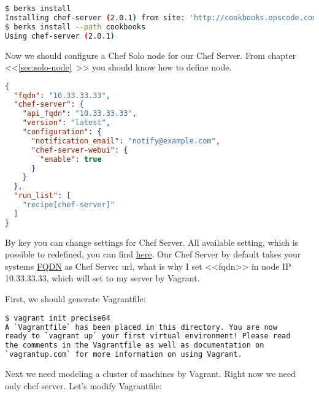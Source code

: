 \begin{lstlisting}[language=Bash,label=lst:my-server-cloud-installation3]
$ berks install
Installing chef-server (2.0.1) from site: 'http://cookbooks.opscode.com/api/v1/cookbooks'
$ berks install --path cookbooks
Using chef-server (2.0.1)
\end{lstlisting}

Now we should configure a Chef Solo node for our Chef Server. From chapter <<\ref{sec:solo-node}~>> you should know how to define node.

\begin{lstlisting}[language=JSON,label=lst:my-server-cloud-installation4,title=my-server-cloud/nodes/chef-server.example.com.json]
{
  "fqdn": "10.33.33.33",
  "chef-server": {
    "api_fqdn": "10.33.33.33",
    "version": "latest",
    "configuration": {
      "notification_email": "notify@example.com",
      "chef-server-webui": {
        "enable": true
      }
    }
  },
  "run_list": [
    "recipe[chef-server]"
  ]
}
\end{lstlisting}

By  key you can change settings for Chef Server. All available setting, which is possible to redefined, you can find \href{https://github.com/opscode/omnibus-chef-server/blob/master/files/chef-server-cookbooks/chef-server/attributes/default.rb}{here}. Our Chef Server by default takes your systems \href{http://en.wikipedia.org/wiki/Fully\_qualified\_domain\_name}{FQDN} as Chef Server url, what is why I set <<fqdn>> in node IP 10.33.33.33, which will set to my server by Vagrant.

First, we should generate Vagrantfile:

\begin{lstlisting}[language=Bash,label=lst:my-server-cloud-installation5]
$ vagrant init precise64
A `Vagrantfile` has been placed in this directory. You are now
ready to `vagrant up` your first virtual environment! Please read
the comments in the Vagrantfile as well as documentation on
`vagrantup.com` for more information on using Vagrant.
\end{lstlisting}

Next we need modeling a cluster of machines by Vagrant. Right now we need only chef server. Let's modify Vagrantfile:

